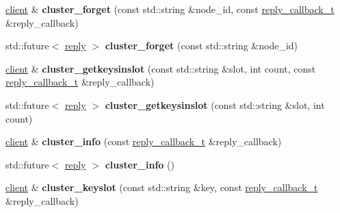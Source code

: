 \begin{DoxyCompactItemize}
\mbox{\hyperlink{classcpp__redis_1_1client}{client}} \& {\bfseries cluster\+\_\+forget} (const std\+::string \&node\+\_\+id, const \mbox{\hyperlink{classcpp__redis_1_1client_af7a65eb21aa25230bfbb0b0203c4fc04}{reply\+\_\+callback\+\_\+t}} \&reply\+\_\+callback)
\item 
\mbox{\label{classcpp__redis_1_1client_a58457400352dee764066bd9f737f667a}} 
std\+::future$<$ \mbox{\hyperlink{classcpp__redis_1_1reply}{reply}} $>$ {\bfseries cluster\+\_\+forget} (const std\+::string \&node\+\_\+id)
\item 
\mbox{\label{classcpp__redis_1_1client_a716e31987800e3ca5483f72972fecfb0}} 
\mbox{\hyperlink{classcpp__redis_1_1client}{client}} \& {\bfseries cluster\+\_\+getkeysinslot} (const std\+::string \&slot, int count, const \mbox{\hyperlink{classcpp__redis_1_1client_af7a65eb21aa25230bfbb0b0203c4fc04}{reply\+\_\+callback\+\_\+t}} \&reply\+\_\+callback)
\item 
\mbox{\label{classcpp__redis_1_1client_ad644ef5c24f3eb51de30a827753cc077}} 
std\+::future$<$ \mbox{\hyperlink{classcpp__redis_1_1reply}{reply}} $>$ {\bfseries cluster\+\_\+getkeysinslot} (const std\+::string \&slot, int count)
\item 
\mbox{\label{classcpp__redis_1_1client_a831d52a9dc9115e817bae15db0fb18a6}} 
\mbox{\hyperlink{classcpp__redis_1_1client}{client}} \& {\bfseries cluster\+\_\+info} (const \mbox{\hyperlink{classcpp__redis_1_1client_af7a65eb21aa25230bfbb0b0203c4fc04}{reply\+\_\+callback\+\_\+t}} \&reply\+\_\+callback)
\item 
\mbox{\label{classcpp__redis_1_1client_a993170e08c425a810fa757bd4c202d10}} 
std\+::future$<$ \mbox{\hyperlink{classcpp__redis_1_1reply}{reply}} $>$ {\bfseries cluster\+\_\+info} ()
\item 
\mbox{\label{classcpp__redis_1_1client_ae0314fc2697674f4be4fca1cc5cbd4a1}} 
\mbox{\hyperlink{classcpp__redis_1_1client}{client}} \& {\bfseries cluster\+\_\+keyslot} (const std\+::string \&key, const \mbox{\hyperlink{classcpp__redis_1_1client_af7a65eb21aa25230bfbb0b0203c4fc04}{reply\+\_\+callback\+\_\+t}} \&reply\+\_\+callback)
\item 

\end{DoxyCompactItemize}
